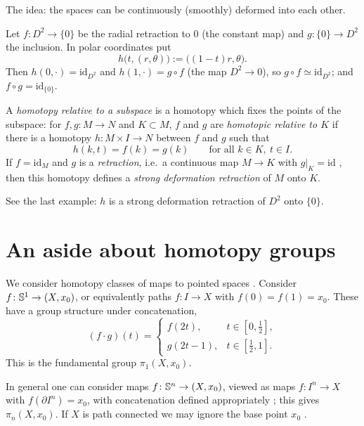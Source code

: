 The idea: the spaces can be continuously (smoothly) deformed into each other.

\begin{example}[$D^2\simeq\{0\}$]
\label{L07:ex:disk}
Let $f\colon D^2\to\{0\}$ be the radial retraction to $0$ (the constant map) and
$g\colon\{0\}\to D^2$ the inclusion. In polar coordinates put
\[
  h\big(t,(r,\theta)\big):=\big((1-t)r,\theta\big).
\]
Then $h(0,\cdot)=\mathrm{id}_{D^2}$ and $h(1,\cdot)=g\circ f$ (the map $D^2\to 0$), so
$g\circ f\simeq\mathrm{id}_{D^2}$; and $f\circ g=\mathrm{id}_{\{0\}}$.
\end{example}

\begin{definition}
\label{L07:def:relhom}
A \emph{homotopy relative to a subspace} is a homotopy which fixes the points of the
subspace: for $f,g\colon M\to N$ and $K\subset M$, $f$ and $g$ are \emph{homotopic
relative to $K$} if there is a homotopy $h\colon M\times I\to N$ between $f$ and $g$ such
that
\[
  h(k,t)=f(k)=g(k)\qquad\text{for all } k\in K,\ t\in I .
\]
If $f=\mathrm{id}_M$ and $g$ is a \emph{retraction}, i.e.\ a continuous map $M\to K$ with
$g|_K=\mathrm{id}$ , then this
homotopy defines a \emph{strong deformation retraction} of $M$ onto $K$.
\end{definition}
See the last example: $h$ is a strong deformation retraction of $D^2$ onto $\{0\}$.

\section{An aside about homotopy groups}
\label{L07:sec:homotopygroups}

We consider homotopy classes of maps to pointed spaces
. Consider
$f\colon \mathbb{S}^1\to(X,x_0)$, or equivalently paths $f\colon I\to X$ with
$f(0)=f(1)=x_0$. These have a group structure under concatenation,
\[
  (f\cdot g)(t)=\begin{cases} f(2t), & t\in[0,\tfrac12],\\ g(2t-1), & t\in[\tfrac12,1].\end{cases}
\]
This is the fundamental group $\pi_1(X,x_0)$.

In general one can consider maps $f\colon\mathbb{S}^n\to(X,x_0)$, viewed as maps
$f\colon I^n\to X$ with $f(\partial I^n)=x_0$, with concatenation defined appropriately
; this gives $\pi_n(X,x_0)$. If $X$ is path connected we
may ignore the base point $x_0$ .

